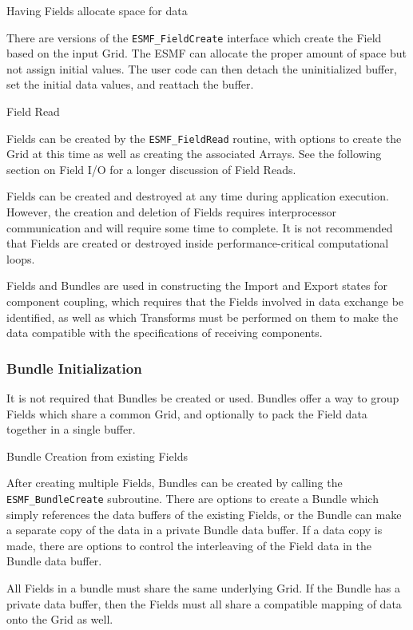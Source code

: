 \begin{description}
\item{Having Fields allocate space for data}

There are versions of the {\tt ESMF\_FieldCreate} interface
which create the Field based on the input Grid.  The ESMF
can allocate the proper amount of 
space but not assign initial values.  The user code
can then detach the uninitialized buffer, set the
initial data values, and reattach the buffer.

\item{Field Read}

Fields can be created by the {\tt ESMF\_FieldRead}
routine, with options to create the Grid at this time
as well as creating the associated Arrays.
See the following section on Field I/O for a longer
discussion of Field Reads.

\end{description}

Fields can be created and destroyed
at any time during application execution.  However, the creation
and deletion of Fields requires interprocessor communication
and will require some time to complete.  It is not recommended
that Fields are created or destroyed
inside performance-critical computational loops.

Fields and Bundles are used in constructing 
the Import and Export states for component coupling, 
which requires that the 
Fields involved in data exchange be identified, as well as
which Transforms must be performed on them to make the
data compatible with the specifications of
receiving components.  

\subsubsection{Bundle Initialization}

It is not required that Bundles be created or used.
Bundles offer a way to group Fields which share a
common Grid, and optionally to pack the Field data
together in a single buffer.

\begin{description}

\item{Bundle Creation from existing Fields}

After creating multiple Fields, Bundles can be created
by calling the {\tt ESMF\_BundleCreate} subroutine.  There are
options to create a Bundle which simply references
the data buffers of the existing Fields, 
or the Bundle can make a separate copy of the data in a private 
Bundle data buffer.  If a data copy is made, there are options to
control the interleaving of the Field data in the Bundle data buffer.

All Fields in a bundle must share the same underlying Grid.
If the Bundle has a private data buffer, then the Fields must
all share a compatible mapping of data onto the Grid as well.

\end{description}

